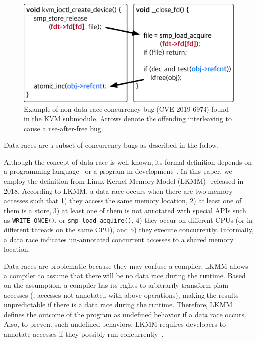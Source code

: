 \begin{figure}[h]
  \centering
  \includegraphics[width=0.85\linewidth]{fig/racecondition.pdf}
  \caption{Example of non-data race concurrency bug (CVE-2019-6974)
    found in the KVM submodule. Arrows denote the offending
    interleaving to cause a use-after-free bug.}
  \label{fig:concurrencybugs}
\end{figure}

Data races are a subset of concurrency bugs as described in the
follow.

%
Although the concept of data race is well known, its formal definition
depends on a programming language~\cite{C-standard-n2310,
  java-standard} or a program in development~\cite{lkmm}. In this
paper, we employ the definition from Linux Kernel Memory Model
(LKMM)~\cite{lkmm} released in 2018. According to LKMM, a data race
occurs when there are two memory accesses such that 1) they access the
same memory location, 2) at least one of them is a store, 3) at least
one of them is not annotated with special APIs such as
\texttt{WRITE_ONCE()}, or \texttt{smp_load_acquire()}, 4) they occur
on different CPUs (or in different threads on the same CPU), and 5)
they execute concurrently.
%
Informally, a data race indicates un-annotated concurrent accesses to
a shared memory location.

Data races are problematic because they may confuse a compiler.  LKMM
allows a compiler to assume that there will be no data race during the
runtime. Based on the assumption, a compiler has its rights to
arbitrarily transform plain accesses (\ie, accesses not annotated with
above operations), making the results unpredictable if there is a data
race during the runtime.
%
Therefore, LKMM defines the outcome of the program as undefined
behavior if a data race occurs.
%
Also, to prevent such undefined behaviors, LKMM requires developers to
annotate accesses if they possibly run
concurrently~\cite{data-race-fix1, data-race-fix2, data-race-fix3}.


